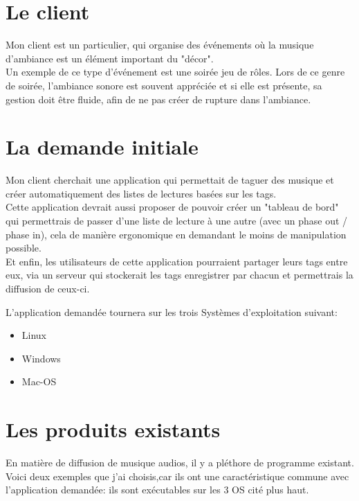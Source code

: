 \documentclass[a4paper,12pt]{report}
\begin{document}
\section{Le client}

Mon client est un particulier, qui organise des événements où la musique d'ambiance est un élément important du "décor". \\

Un exemple de ce type d'événement est une soirée jeu de rôles.
Lors de ce genre de soirée, l'ambiance sonore est souvent appréciée et si elle est présente, sa gestion doit être fluide, afin de ne pas créer de rupture dans l'ambiance.

\section{La demande initiale}
Mon client cherchait une application qui permettait de taguer des musique et créer automatiquement des listes de lectures basées sur les tags.\\

Cette application devrait aussi proposer de pouvoir créer un "tableau de bord" qui permettrais de passer d'une liste de lecture à une autre (avec un phase out / phase in), cela de manière ergonomique en demandant le moins de manipulation possible.\\

Et enfin, les utilisateurs de cette application pourraient partager leurs tags entre eux, via un serveur qui stockerait les tags enregistrer par chacun et permettrais la diffusion de ceux-ci.

L'application demandée tournera sur les trois Systèmes d'exploitation suivant:\\

\begin{itemize}
\item Linux
\item Windows
\item Mac-OS
\end{itemize}

\section{Les produits existants}

En matière de diffusion de musique audios, il y a pléthore de programme existant.
Voici deux exemples que j'ai choisis,car ils ont une caractéristique commune avec l'application demandée: ils sont exécutables sur les 3 OS cité plus haut. \\
\end{document}
